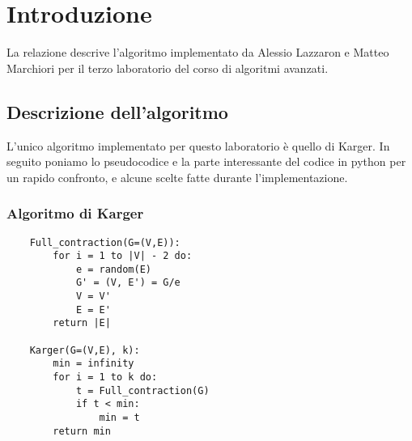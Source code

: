 \chapter{Introduzione\label{sec:introduzione}}
\noindent La relazione descrive l'algoritmo implementato da Alessio Lazzaron e Matteo Marchiori per il terzo laboratorio del corso di algoritmi avanzati.

\section{Descrizione dell'algoritmo\label{sec:descrizione}}
L'unico algoritmo implementato per questo laboratorio è quello di Karger.
In seguito poniamo lo pseudocodice e la parte interessante del codice in python per un rapido confronto, e alcune scelte fatte durante l'implementazione.

\subsection{Algoritmo di Karger\label{sec:karger}}
\begin{verbatim}
    Full_contraction(G=(V,E)):
        for i = 1 to |V| - 2 do:
            e = random(E)
            G' = (V, E') = G/e
            V = V'
            E = E'
        return |E|    
    
    Karger(G=(V,E), k):
        min = infinity
        for i = 1 to k do:
            t = Full_contraction(G)
            if t < min:
                min = t
        return min                
\end{verbatim}

\clearpage

